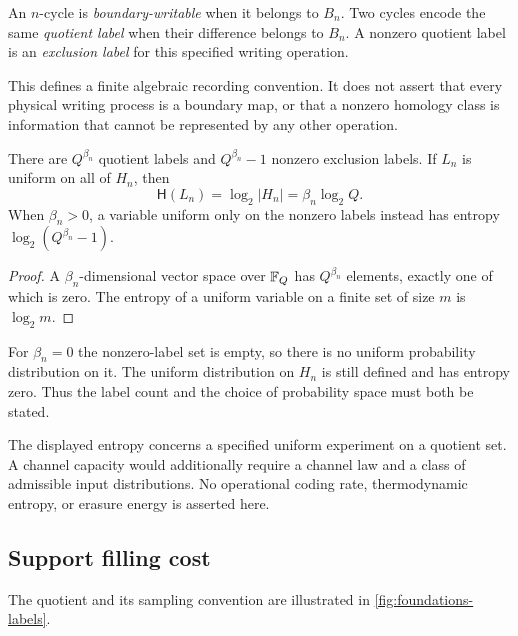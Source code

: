 \documentclass[11pt,a4paper]{article}
\begin{document}
\begin{definition}\label{def:writing}
An $n$-cycle is \emph{boundary-writable} when it belongs to $B_n$.
Two cycles encode the same \emph{quotient label} when their difference
belongs to $B_n$.  A nonzero quotient label is an \emph{exclusion label}
for this specified writing operation.
\end{definition}

This defines a finite algebraic recording convention.  It does not assert
that every physical writing process is a boundary map, or that a nonzero
homology class is information that cannot be represented by any other
operation.

\begin{theorem}\label{thm:labels}
There are $Q^{\beta_n}$ quotient labels and $Q^{\beta_n}-1$ nonzero
exclusion labels.  If $L_n$ is uniform on all of $H_n$, then
\[
 \mathsf H(L_n)=\log_2|H_n|=\beta_n\log_2 Q.
\]
When $\beta_n>0$, a variable uniform only on the nonzero labels instead
has entropy $\log_2(Q^{\beta_n}-1)$.
\end{theorem}

\begin{proof}
A $\beta_n$-dimensional vector space over $\mathbb F_Q$ has
$Q^{\beta_n}$ elements, exactly one of which is zero.  The entropy of a
uniform variable on a finite set of size $m$ is $\log_2m$.
\end{proof}

For $\beta_n=0$ the nonzero-label set is empty, so there is no uniform
probability distribution on it.  The uniform distribution on $H_n$ is
still defined and has entropy zero.  Thus the label count and the choice
of probability space must both be stated.

\begin{remark}
The displayed entropy concerns a specified uniform experiment on a
quotient set.  A channel capacity would additionally require a channel
law and a class of admissible input distributions.  No operational coding
rate, thermodynamic entropy, or erasure energy is asserted here.
\end{remark}

\subsection{Support filling cost}

The quotient and its sampling convention are illustrated in
\cref{fig:foundations-labels}.

\end{document}
